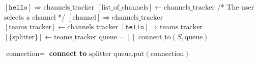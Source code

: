\documentclass{article}
\begin{document}
\pagestyle{empty}

\newcommand{\send}{\Rightarrow}
\newcommand{\sendto}{\rightarrow}
\algrenewcommand{}
\algrenewcommand\textproc{\textrm}

\begin{algorithmic}
  \State $[\mathtt{hello}] \send \text{channels\_tracker}$
  \State $[\text{list\_of\_channels}] \gets \text{channels\_tracker}$
  \State /* The user selects a channel */
  \State $[\text{channel}] \send \text{channels\_tracker}$
  \State $[\text{teams\_tracker}] \gets \text{channels\_tracker}$
  \State $[\mathtt{hello}] \send \text{teams\_tracker}$
  \State $[\{\text{splitter}\}] \gets \text{teams\_tracker}$
  \State $\text{queue}=[]$
  \State $\text{connect\_to}(S, \text{queue})$
  \EndFor 
  \EndFunction

  \algrenewcommand{}

  \State $\text{connection} =$ \textbf{connect to} $\text{splitter}$
  \State $\text{queue}.\text{put}(\text{connection})$
  \EndIf
  \EndFunction
  \EndProcedure

\end{algorithmic}
\end{document}

